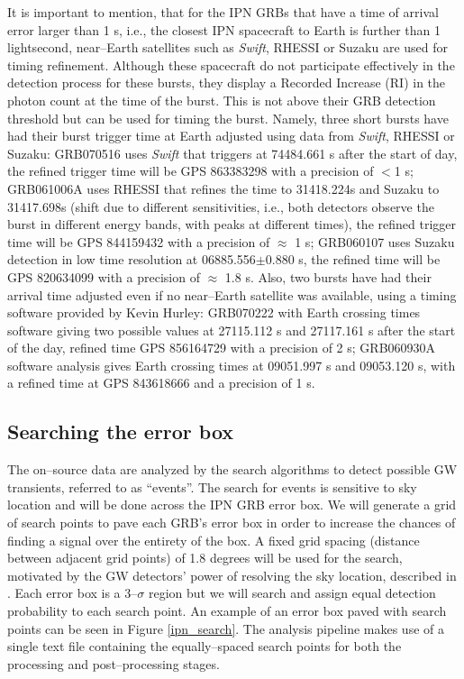 It is important to mention, that for the IPN GRBs that have a time of arrival error larger than 1 s, i.e., the closest IPN spacecraft to Earth is further than 1 lightsecond, near--Earth satellites such as \emph{Swift}, RHESSI or Suzaku are used for timing refinement. Although these spacecraft do not participate effectively in the detection process for these bursts, they display a Recorded Increase (RI) in the photon count at the time of the burst. This is not above their GRB detection threshold but can be used for timing the burst. Namely, three short bursts have had their burst trigger time at Earth adjusted using data from \emph{Swift}, RHESSI or Suzaku: GRB070516 uses \emph{Swift} that triggers at 74484.661 s after the start of day, the refined trigger time will be GPS 863383298 with a precision of $<$1 s; GRB061006A uses RHESSI that refines the time to 31418.224s and Suzaku to 31417.698s (shift due to different sensitivities, i.e., both detectors observe the burst in different energy bands, with peaks at different times), the refined trigger time will be GPS 844159432 with a precision of $\approx$ 1 s; GRB060107 uses Suzaku detection in low time resolution at 06885.556$\pm$0.880 s, the refined time will be GPS 820634099 with a precision of $\approx$ 1.8 s. Also, two bursts have had their arrival time adjusted even if no near--Earth satellite was available, using a timing software provided by Kevin Hurley: GRB070222 with Earth crossing times software giving two possible values at 27115.112 s and 27117.161 s after the start of the day, refined time GPS 856164729 with a precision of 2 s; GRB060930A software analysis gives Earth crossing times at 09051.997 s and 09053.120 s, with a refined time at GPS 843618666 and a precision of 1 s.   

\subsection{Searching the error box}
The on--source data are analyzed by the search algorithms to detect possible GW transients, referred to as ``events''. The search for events is sensitive to sky location and will be done across the IPN GRB error box. We will generate a grid of search points to pave each GRB's error box in order to increase the chances of finding a signal over the entirety of the box. A fixed grid spacing (distance between adjacent grid points) of 1.8 degrees will be used for the search, motivated by the GW detectors' power of resolving the sky location, described in \cite{Predoi:2011aa}. Each error box is a 3--$\sigma$ region but we will search and assign equal detection probability to each search point. An example of an error box paved with search points can be seen in Figure \ref{ipn_search}. The analysis pipeline makes use of a single text file containing the equally--spaced search points for both the processing and post--processing stages. 

